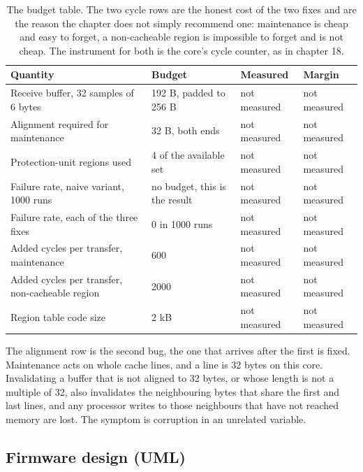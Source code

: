 \begin{table}[H]\centering\small
\begin{tabular}{p{44mm}p{28mm}p{28mm}p{30mm}}
\toprule
Quantity & Budget & Measured & Margin \\
\midrule
Receive buffer, 32 samples of 6 bytes & 192 B, padded to 256 B & not measured & not measured \\
Alignment required for maintenance & 32 B, both ends & not measured & not measured \\
Protection-unit regions used & 4 of the available set & not measured & not measured \\
Failure rate, naive variant, 1000 runs & no budget, this is the result & not measured & not measured \\
Failure rate, each of the three fixes & 0 in 1000 runs & not measured & not measured \\
Added cycles per transfer, maintenance & 600 & not measured & not measured \\
Added cycles per transfer, non-cacheable region & 2000 & not measured & not measured \\
Region table code size & 2 kB & not measured & not measured \\
\bottomrule
\end{tabular}
\caption{The budget table. The two cycle rows are the honest cost of the two fixes and are the reason the chapter does not simply recommend one: maintenance is cheap and easy to forget, a non-cacheable region is impossible to forget and is not cheap. The instrument for both is the core's cycle counter, as in chapter 18.}
\end{table}

The alignment row is the second bug, the one that arrives after the first is
fixed. Maintenance acts on whole cache lines, and a line is 32 bytes on this
core. Invalidating a buffer that is not aligned to 32 bytes, or whose length is
not a multiple of 32, also invalidates the neighbouring bytes that share the
first and last lines, and any processor writes to those neighbours that have
not reached memory are lost. The symptom is corruption in an unrelated
variable.

\subsection*{Firmware design (UML)}


